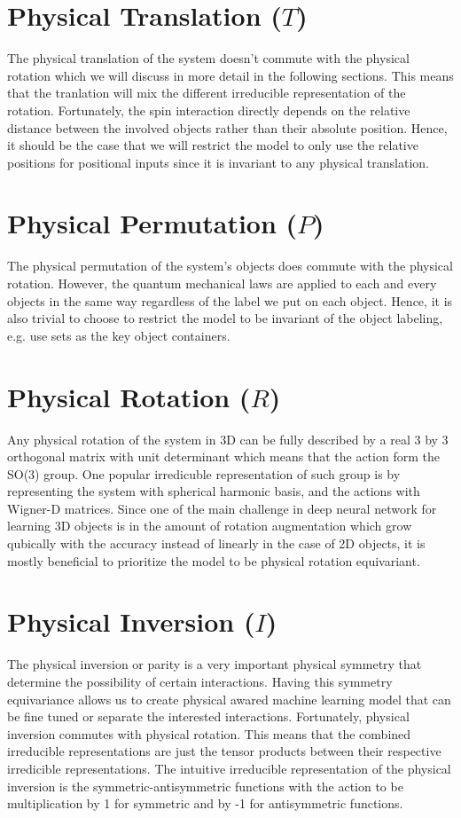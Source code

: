 \documentclass[reprint, 10pt]{revtex4-2}
\begin{document}
\section{Physical Translation ($T$)}
The physical translation of the system doesn't commute with the physical rotation which we will discuss in more
detail in the following sections. This means that the tranlation will mix the different irreducible representation of 
the rotation. Fortunately, the spin interaction directly depends on the relative distance between the involved objects
rather than their absolute position. Hence, it should be the case that we will restrict the model to only use the relative 
positions for positional inputs since it is invariant to any physical translation.

\section{Physical Permutation ($P$)}
The physical permutation of the system's objects does commute with the physical rotation. However, the quantum
mechanical laws are applied to each and every objects in the same way regardless of the label we put on each object.
Hence, it is also trivial to choose to restrict the model to be invariant of the object labeling, e.g. use sets as the
key object containers.

\section{Physical Rotation ($R$)}
Any physical rotation of the system in 3D can be fully described by a real 3 by 3 orthogonal matrix with unit determinant
which means that the action form the SO(3) group. One popular irredicuble representation of such group is by representing
the system with spherical harmonic basis, and the actions with Wigner-D matrices. Since one of the main challenge in 
deep neural network for learning 3D objects is in the amount of rotation augmentation which grow qubically with the 
accuracy instead of linearly in the case of 2D objects, it is mostly beneficial to prioritize the model to be physical
rotation equivariant.

\section{Physical Inversion ($I$)}
The physical inversion or parity is a very important physical symmetry that determine the possibility of certain interactions.
Having this symmetry equivariance allows us to create physical awared machine learning model that can be fine tuned or separate
the interested interactions. Fortunately, physical inversion commutes with physical rotation. This means that the combined
irreducible representations are just the tensor products between their respective irredicible representations. The intuitive
irreducible representation of the physical inversion is the symmetric-antisymmetric functions with the action to be multiplication
by 1 for symmetric and by -1 for antisymmetric functions.
\end{document}
